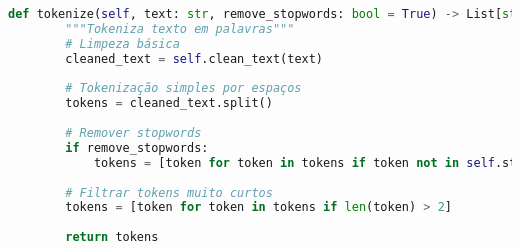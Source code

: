 \begin{pythonbox}
\begin{lstlisting}[language=Python]   
    def tokenize(self, text: str, remove_stopwords: bool = True) -> List[str]:
        """Tokeniza texto em palavras"""
        # Limpeza básica
        cleaned_text = self.clean_text(text)
        
        # Tokenização simples por espaços
        tokens = cleaned_text.split()
        
        # Remover stopwords
        if remove_stopwords:
            tokens = [token for token in tokens if token not in self.stopwords]
            
        # Filtrar tokens muito curtos
        tokens = [token for token in tokens if len(token) > 2]
        
        return tokens
\end{lstlisting}
\end{pythonbox}

